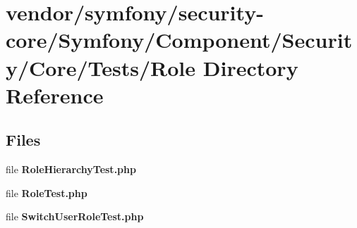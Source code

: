\section{vendor/symfony/security-\/core/\+Symfony/\+Component/\+Security/\+Core/\+Tests/\+Role Directory Reference}
\label{dir_e9a58c6b0301ae3af5131e1e3c5e00ad}
\subsection*{Files}
\begin{DoxyCompactItemize}
\item 
file {\bf Role\+Hierarchy\+Test.\+php}
\item 
file {\bf Role\+Test.\+php}
\item 
file {\bf Switch\+User\+Role\+Test.\+php}
\end{DoxyCompactItemize}

